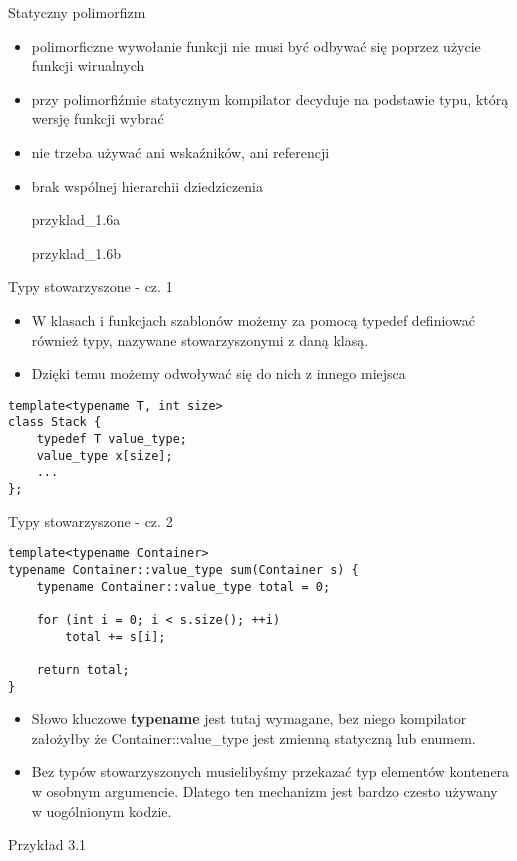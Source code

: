 \documentclass[11pt]{beamer}
\begin{document}
\begin{frame}[fragile]{Statyczny polimorfizm}
	\begin{itemize}
		\item polimorficzne wywołanie funkcji nie musi być odbywać się poprzez użycie funkcji wirualnych
		\item przy polimorfiźmie statycznym kompilator decyduje na podstawie typu, którą wersję funkcji wybrać
		\item nie trzeba używać ani wskaźników, ani referencji
		\item brak wspólnej hierarchii dziedziczenia
		
		\alert{przyklad\_1.6a}
		
		\alert{przyklad\_1.6b}
	\end{itemize}

\end{frame}

\begin{frame}[fragile]{Typy stowarzyszone - cz. 1}
    \begin{itemize}
        \item W klasach i funkcjach szablonów możemy za pomocą typedef definiować również typy, nazywane stowarzyszonymi z daną klasą.
        \item Dzięki temu możemy odwoływać się do nich z innego miejsca
    \end{itemize}
    \begin{lstlisting}[frame=single]
template<typename T, int size>
class Stack {
    typedef T value_type;
    value_type x[size];
    ...
};
    \end{lstlisting}
\end{frame}

\begin{frame}[fragile]{Typy stowarzyszone - cz. 2}
    \begin{lstlisting}[frame=single,basicstyle=\small]
template<typename Container>
typename Container::value_type sum(Container s) {
    typename Container::value_type total = 0;
    
    for (int i = 0; i < s.size(); ++i)
        total += s[i];

    return total;
}
    \end{lstlisting}
    \begin{itemize}
        \item Słowo kluczowe \textbf{typename} jest tutaj wymagane, bez niego kompilator założyłby że Container::value\_type jest zmienną statyczną lub enumem.
        \item Bez typów stowarzyszonych musielibyśmy przekazać typ elementów kontenera w osobnym argumencie. Dlatego ten mechanizm jest bardzo czesto używany w uogólnionym kodzie.
    \end{itemize}
    \alert{Przykład 3.1} 
\end{frame}
\end{document}
